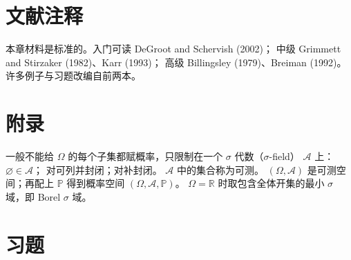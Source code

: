 \section{文献注释}

本章材料是标准的。入门可读 DeGroot and Schervish (2002)；
中级 Grimmett and Stirzaker (1982)、Karr (1993)；
高级 Billingsley (1979)、Breiman (1992)。
许多例子与习题改编自前两本。

\section{附录}

一般不能给 $\Omega$ 的每个子集都赋概率，只限制在一个 $\sigma$ 代数（$\sigma$-field）
$\mathcal{A}$ 上：$\varnothing\in\mathcal{A}$；
对可列并封闭；对补封闭。
$\mathcal{A}$ 中的集合称为可测。
$(\Omega,\mathcal{A})$ 是可测空间；再配上 $\mathbb{P}$ 得到概率空间 $(\Omega,\mathcal{A},\mathbb{P})$。
$\Omega=\mathbb{R}$ 时取包含全体开集的最小 $\sigma$ 域，即 Borel $\sigma$ 域。

\section{习题}

\pending
